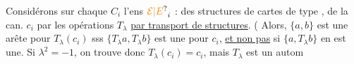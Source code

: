 Considérons sur chaque $C_i$ l'ens $\unsure{\mathcal E|E}_i$ :  des structures de cartes de type ,  de la can. $c_i$ par les opérations $T_\lambda$ \uline{par transport de structures}.  ( Alors, $\{a,b\}$ est une arête pour $T_\lambda(c_i)$ sss  $\{T_\lambda a,T_\lambda b\}$  est une pour $c_i$, \uline{et non pas} si $\{a,T_\lambda b\}$ en est une.  Si $\lambda^2=-1$, on trouve donc $T_\lambda(c_i)=c_i$, mais $T_\lambda$ est un autom
